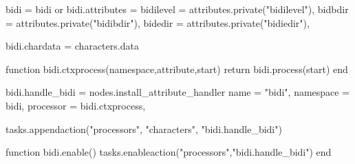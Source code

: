 

\startmodule[bidi]

\unprotect

\startluacode

bidi            = bidi or { }
bidi.attributes = {
    bidilevel   = attributes.private("bidilevel"),
    bidbdir     = attributes.private("bidibdir"),
    bidedir     = attributes.private("bidiedir"),
}

bidi.chardata   = characters.data

\stopluacode


\startluacode

function bidi.ctxprocess(namespace,attribute,start)
    return bidi.process(start)
end

bidi.handle_bidi = nodes.install_attribute_handler {
    name      = "bidi",
    namespace = bidi,
    processor = bidi.ctxprocess,
}

tasks.appendaction("processors", "characters",  "bidi.handle_bidi")

function bidi.enable()
    tasks.enableaction("processors","bidi.handle_bidi")
end

\stopluacode

\protect \endinput
